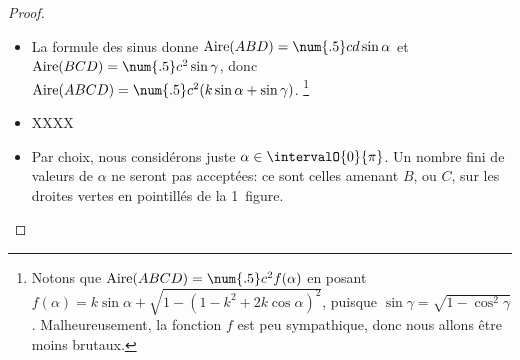 \begin{proof}
\begin{itemize}
	    \item La formule des sinus donne
	    $\area{ABD} = \num{.5} c d \sin \alpha$
	    et
	    $\area{BCD} = \num{.5} c^2 \sin \gamma$,
	   	donc
	    $\area{ABCD} = \num{.5} c^2 ( k \sin \alpha + \sin \gamma )$.%
	    \footnote{
    	    Notons que
    	    $\area{ABCD} = \num{.5} c^2 f(\alpha)$
    	    en posant 
    	    $f(\alpha) = k \sin \alpha + \sqrt{1 - ( 1 - k^2 + 2 k \cos \alpha)^2}$,
	    	puisque 
	    	$\sin \gamma = \sqrt{1 - \cos^2 \gamma}$. 
	    	Malheureusement, la fonction $f$ est peu sympathique, donc nous allons être moins brutaux.
        }


	    \item XXXX


	    \item Par choix, nous considérons juste $\alpha \in \intervalO{0}{\pi}$. Un nombre fini de valeurs de $\alpha$ ne seront pas acceptées: ce sont celles amenant $B$, ou $C$, sur les droites vertes en pointillés de la 1\iere\ figure. 
	\end{itemize}

	



\end{proof}

